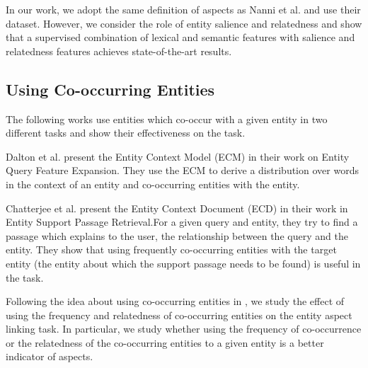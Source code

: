 
In our work, we adopt the same definition of aspects as Nanni  et al. \cite{nanni2018entity} and use their dataset. However, we consider the role of entity salience and relatedness and show that a supervised combination of lexical and semantic features with salience and relatedness features achieves state-of-the-art results.

\subsection{Using Co-occurring Entities}
The following works use entities which co-occur with a given entity in two different tasks and show their effectiveness on the task. 

Dalton et al. \cite{dalton2014entity} present the Entity Context Model (ECM) in their work on Entity Query Feature Expansion. They use the ECM to derive a distribution over words in the context of an entity and co-occurring entities with the entity.

Chatterjee et al. \cite{chatterjee2019why} present the Entity Context Document (ECD) in their work in Entity Support Passage Retrieval.For a given query and entity, they try to find a passage which explains to the user, the relationship between the query and the entity. They show that using frequently co-occurring entities with the target entity (the entity about which the support passage needs to be found) is useful in the task.

Following the idea about using co-occurring entities in \cite{dalton2014entity, chatterjee2019why}, we study the effect of using the frequency and relatedness of co-occurring entities on the entity aspect linking task. In particular, we study whether using the frequency of co-occurrence or the relatedness of the co-occurring entities to a given entity is a better indicator of aspects. 

